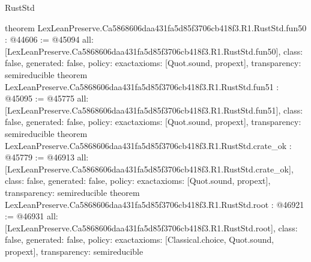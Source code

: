 \begin{lexlean}{RustStd}
\begin{coremodule}
{}
theorem LexLeanPreserve.Ca5868606daa431fa5d85f3706cb418f3.R1.RustStd.fun50 : @44606 := @45094 {
  all: [LexLeanPreserve.Ca5868606daa431fa5d85f3706cb418f3.R1.RustStd.fun50],
  class: false,
  generated: false,
  policy: exact{axioms: [Quot.sound, propext]},
  transparency: semireducible
}
theorem LexLeanPreserve.Ca5868606daa431fa5d85f3706cb418f3.R1.RustStd.fun51 : @45095 := @45775 {
  all: [LexLeanPreserve.Ca5868606daa431fa5d85f3706cb418f3.R1.RustStd.fun51],
  class: false,
  generated: false,
  policy: exact{axioms: [Quot.sound, propext]},
  transparency: semireducible
}
theorem LexLeanPreserve.Ca5868606daa431fa5d85f3706cb418f3.R1.RustStd.crate_ok : @45779 := @46913 {
  all: [LexLeanPreserve.Ca5868606daa431fa5d85f3706cb418f3.R1.RustStd.crate_ok],
  class: false,
  generated: false,
  policy: exact{axioms: [Quot.sound, propext]},
  transparency: semireducible
}
theorem LexLeanPreserve.Ca5868606daa431fa5d85f3706cb418f3.R1.RustStd.root : @46921 := @46931 {
  all: [LexLeanPreserve.Ca5868606daa431fa5d85f3706cb418f3.R1.RustStd.root],
  class: false,
  generated: false,
  policy: exact{axioms: [Classical.choice, Quot.sound, propext]},
  transparency: semireducible
}


\end{coremodule}
\end{lexlean}
